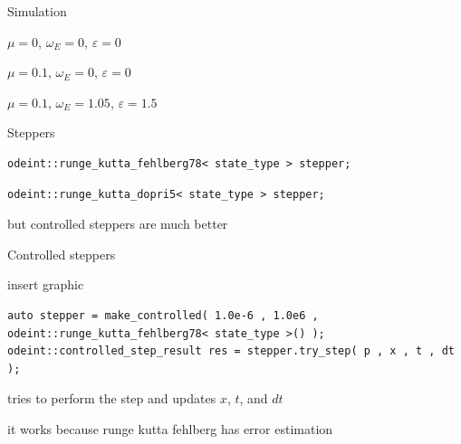 \begin{frame}[fragile]
 Simulation

 $\mu=0$, $\omega_E = 0$, $\varepsilon=0$

 $\mu=0.1$, $\omega_E = 0$, $\varepsilon=0$

 $\mu=0.1$, $\omega_E = 1.05$, $\varepsilon=1.5$
\end{frame}

\begin{frame}[fragile]

  Steppers
  \begin{lstlisting}
odeint::runge_kutta_fehlberg78< state_type > stepper;
  \end{lstlisting}

  \begin{lstlisting}
odeint::runge_kutta_dopri5< state_type > stepper;
  \end{lstlisting}

  but controlled steppers are much better

\end{frame}


\begin{frame}[fragile]
 Controlled steppers

 insert graphic

 \begin{lstlisting}
auto stepper = make_controlled( 1.0e-6 , 1.0e6 ,  odeint::runge_kutta_fehlberg78< state_type >() );
odeint::controlled_step_result res = stepper.try_step( p , x , t , dt );
 \end{lstlisting}

 tries to perform the step and updates $x$, $t$, and $dt$

 it works because runge kutta fehlberg has error estimation

\end{frame}


